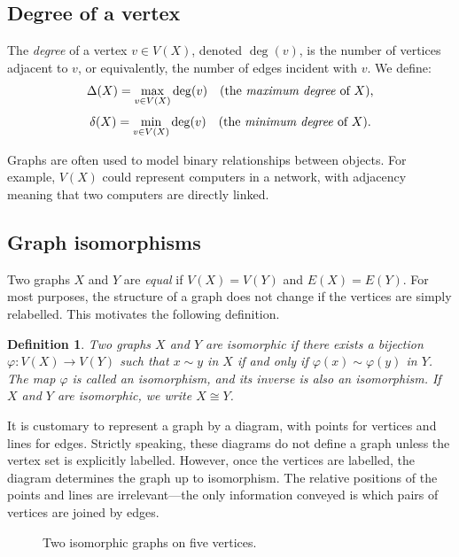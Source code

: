 \documentclass[12pt,a4paper,openany]{book}
\newtheorem{definition}{Definition}[section]
\begin{document}
\subsection*{Degree of a vertex}
The \emph{degree} of a vertex $v \in V(X)$, denoted $\deg(v)$, is the number of vertices adjacent to $v$,  
or equivalently, the number of edges incident with $v$.
We define:
\[
\Delta(X) = \max_{v \in V(X)} \deg(v) \quad\text{(the \emph{maximum degree} of $X$),}
\]
\[
\delta(X) = \min_{v \in V(X)} \deg(v) \quad\text{(the \emph{minimum degree} of $X$).}
\]

Graphs are often used to model binary relationships between objects. For example, 
$V(X)$ could represent computers in a network, with adjacency meaning that two computers are directly linked.

\subsection*{Graph isomorphisms}
Two graphs $X$ and $Y$ are \emph{equal} if $V(X)=V(Y)$ and $E(X)=E(Y)$.  
For most purposes, the structure of a graph does not change if the vertices are simply relabelled.  
This motivates the following definition.

\begin{definition}
Two graphs $X$ and $Y$ are \emph{isomorphic} if there exists a bijection
$\varphi : V(X) \to V(Y)$ such that $x \sim y$ in $X$ if and only if 
$\varphi(x) \sim \varphi(y)$ in $Y$.  
The map $\varphi$ is called an \emph{isomorphism}, and its inverse is also an isomorphism.  
If $X$ and $Y$ are isomorphic, we write $X \cong Y$.
\end{definition}

It is customary to represent a graph by a diagram, with points for vertices and lines for edges.  
Strictly speaking, these diagrams do not define a graph unless the vertex set is explicitly labelled.  
However, once the vertices are labelled, the diagram determines the graph up to isomorphism.  
The relative positions of the points and lines are irrelevant—the only information conveyed is which pairs of vertices are joined by edges.

\begin{figure}[h]
\centering
{}
\caption{Two isomorphic graphs on five vertices.}
\end{figure}
\end{document}
